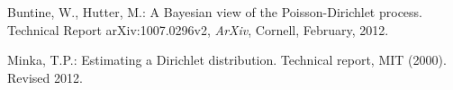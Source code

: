 \documentclass{article}
\begin{document}


\begin{thebibliography}{10}
Buntine, W., Hutter, M.:
\newblock A {B}ayesian view of the {P}oisson-{D}irichlet process.
\newblock Technical Report arXiv:1007.0296v2, {\it ArXiv}, Cornell, February, 
2012.

Minka, T.P.:
\newblock Estimating a {D}irichlet distribution.
\newblock Technical report, MIT (2000).  Revised 2012.
\end{thebibliography}
\end{document}
